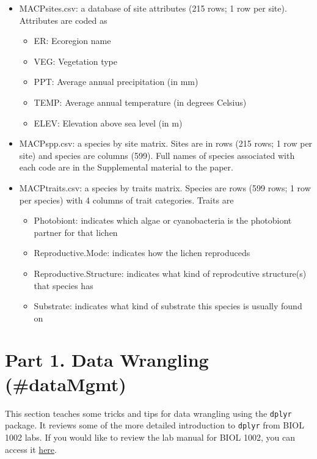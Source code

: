 \documentclass[
]{book}
\providecommand{\tightlist}{%
  \setlength{\itemsep}{0pt}\setlength{\parskip}{0pt}}
\begin{document}
\begin{itemize}
\item
  MACPsites.csv: a database of site attributes (215 rows; 1 row per site). Attributes are coded as

  \begin{itemize}
  \tightlist
  \item
    ER: Ecoregion name
  \item
    VEG: Vegetation type
  \item
    PPT: Average annual precipitation (in mm)
  \item
    TEMP: Average annual temperature (in degrees Celsius)
  \item
    ELEV: Elevation above sea level (in m)
  \end{itemize}
\item
  MACPspp.csv: a species by site matrix. Sites are in rows (215 rows; 1 row per site) and species are columns (599). Full names of species associated with each code are in the Supplemental material to the \citet{McMullin2019} paper.
\item
  MACPtraits.csv: a species by traits matrix. Species are rows (599 rows; 1 row per species) with 4 columns of trait categories. Traits are

  \begin{itemize}
  \tightlist
  \item
    Photobiont: indicates which algae or cyanobacteria is the photobiont partner for that lichen
  \item
    Reproductive.Mode: indicates how the lichen reproduceds
  \item
    Reproductive.Structure: indicates what kind of reprodcutive structure(s) that species has
  \item
    Substrate: indicates what kind of substrate this species is usually found on
  \end{itemize}
\end{itemize}

\hypertarget{part-1.-data-wrangling-datamgmt}{%
\chapter{Part 1. Data Wrangling (\#dataMgmt)}\label{part-1.-data-wrangling-datamgmt}}

This section teaches some tricks and tips for data wrangling using the \texttt{dplyr} package. It reviews some of the more detailed introduction to \texttt{dplyr} from BIOL 1002 labs. If you would like to review the lab manual for BIOL 1002, you can access it \href{https://jakep962.github.io/Biol_1002/index.html}{here}.
\end{document}
